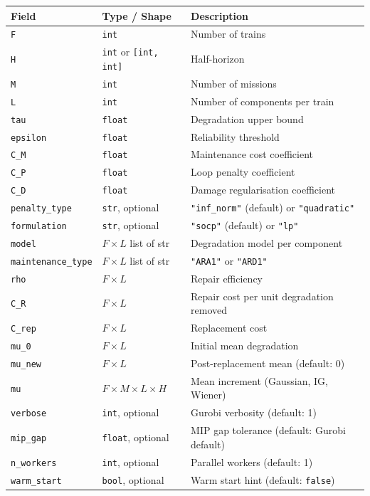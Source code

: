 \documentclass[11pt,a4paper]{article}
\begin{document}
\begin{longtable}{@{}llp{7cm}@{}}
\toprule
Field & Type / Shape & Description \\
\midrule
\texttt{F} & \texttt{int} & Number of trains \\
\texttt{H} & \texttt{int} or \texttt{[int, int]} & Half-horizon \\
\texttt{M} & \texttt{int} & Number of missions \\
\texttt{L} & \texttt{int} & Number of components per train \\
\texttt{tau} & \texttt{float} & Degradation upper bound \\
\texttt{epsilon} & \texttt{float} & Reliability threshold \\
\texttt{C\_M} & \texttt{float} & Maintenance cost coefficient \\
\texttt{C\_P} & \texttt{float} & Loop penalty coefficient \\
\texttt{C\_D} & \texttt{float} & Damage regularisation coefficient \\
\texttt{penalty\_type} & \texttt{str}, optional & \texttt{"inf\_norm"} (default)
  or \texttt{"quadratic"} \\
\texttt{formulation} & \texttt{str}, optional & \texttt{"socp"} (default)
  or \texttt{"lp"} \\
\texttt{model} & $F \times L$ list of str & Degradation model per component \\
\texttt{maintenance\_type} & $F \times L$ list of str & \texttt{"ARA1"} or \texttt{"ARD1"} \\
\texttt{rho} & $F \times L$ & Repair efficiency \\
\texttt{C\_R} & $F \times L$ & Repair cost per unit degradation removed \\
\texttt{C\_rep} & $F \times L$ & Replacement cost \\
\texttt{mu\_0} & $F \times L$ & Initial mean degradation \\
\texttt{mu\_new} & $F \times L$ & Post-replacement mean (default: 0) \\
\texttt{mu} & $F \times M \times L \times H$ & Mean increment (Gaussian, IG, Wiener) \\
\texttt{verbose} & \texttt{int}, optional & Gurobi verbosity (default: 1) \\
\texttt{mip\_gap} & \texttt{float}, optional & MIP gap tolerance (default: Gurobi default) \\
\texttt{n\_workers} & \texttt{int}, optional & Parallel workers (default: 1) \\
\texttt{warm\_start} & \texttt{bool}, optional & Warm start hint (default: \texttt{false}) \\
\bottomrule
\end{longtable}
\end{document}
